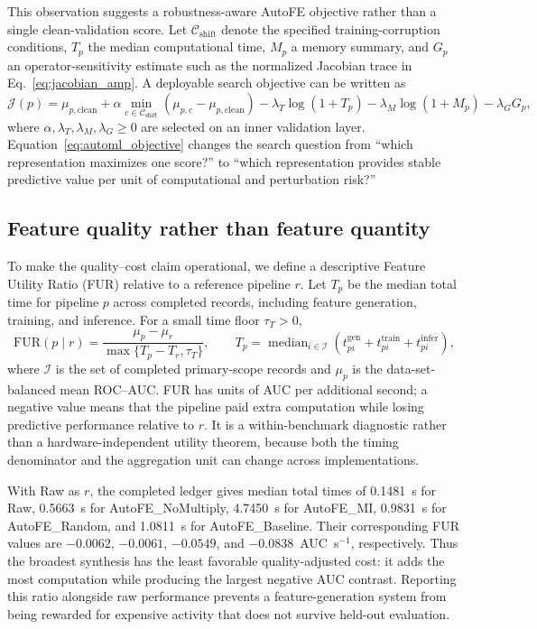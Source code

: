 \documentclass[preprint,12pt]{elsarticle}
\begin{document}
This observation suggests a robustness-aware AutoFE objective rather than a single clean-validation score.  Let $\mathcal{C}_{\mathrm{shift}}$ denote the specified training-corruption conditions, $T_p$ the median computational time, $M_p$ a memory summary, and $G_p$ an operator-sensitivity estimate such as the normalized Jacobian trace in Eq.~\eqref{eq:jacobian_amp}.  A deployable search objective can be written as
\begin{equation}
  \mathcal{J}(p)=\mu_{p,\mathrm{clean}}
  +\alpha\min_{c\in\mathcal{C}_{\mathrm{shift}}}
       \left(\mu_{p,c}-\mu_{p,\mathrm{clean}}\right)
  -\lambda_T\log(1+T_p)
  -\lambda_M\log(1+M_p)
  -\lambda_G G_p,
  \label{eq:automl_objective}
\end{equation}
where $\alpha,\lambda_T,\lambda_M,\lambda_G\ge0$ are selected on an inner validation layer.  Equation~\eqref{eq:automl_objective} changes the search question from ``which representation maximizes one score?'' to ``which representation provides stable predictive value per unit of computational and perturbation risk?''

\subsection{Feature quality rather than feature quantity}
To make the quality--cost claim operational, we define a descriptive Feature Utility Ratio (FUR) relative to a reference pipeline $r$.  Let $T_p$ be the median total time for pipeline $p$ across completed records, including feature generation, training, and inference.  For a small time floor $\tau_T>0$,
\begin{equation}
  \mathrm{FUR}(p\mid r)=
  \frac{\mu_p-\mu_r}{\max\{T_p-T_r,\tau_T\}},
  \qquad
  T_p=\operatorname{median}_{i\in\mathcal{I}}
  \left(t^{\mathrm{gen}}_{pi}+t^{\mathrm{train}}_{pi}+t^{\mathrm{infer}}_{pi}\right),
  \label{eq:fur}
\end{equation}
where $\mathcal{I}$ is the set of completed primary-scope records and $\mu_p$ is the data-set-balanced mean ROC--AUC.  FUR has units of AUC per additional second; a negative value means that the pipeline paid extra computation while losing predictive performance relative to $r$.  It is a within-benchmark diagnostic rather than a hardware-independent utility theorem, because both the timing denominator and the aggregation unit can change across implementations.

With Raw as $r$, the completed ledger gives median total times of 0.1481~s for Raw, 0.5663~s for AutoFE\_NoMultiply, 4.7450~s for AutoFE\_MI, 0.9831~s for AutoFE\_Random, and 1.0811~s for AutoFE\_Baseline.  Their corresponding FUR values are $-0.0062$, $-0.0061$, $-0.0549$, and $-0.0838$~AUC~s$^{-1}$, respectively.  Thus the broadest synthesis has the least favorable quality-adjusted cost: it adds the most computation while producing the largest negative AUC contrast.  Reporting this ratio alongside raw performance prevents a feature-generation system from being rewarded for expensive activity that does not survive held-out evaluation.
\end{document}
